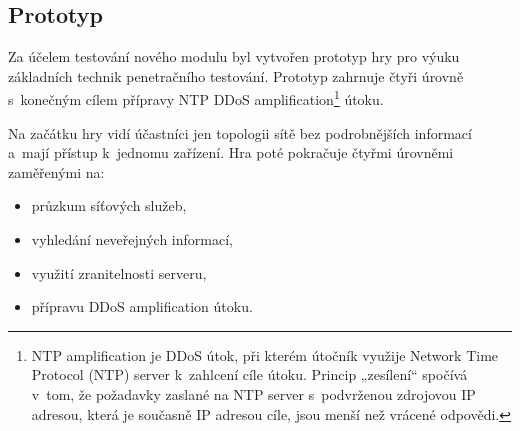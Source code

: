 \documentclass[
  digital, %
  oneside, %
  table,   %
  nolof,     %
  nolot,     %
]{fithesis3}
\begin{document}
\subsection{Prototyp}
Za účelem testování nového modulu byl vytvořen prototyp hry pro výuku základních technik penetračního testování. Prototyp zahrnuje čtyři úrovně s~konečným cílem přípravy NTP DDoS amplification\footnote{NTP amplification je DDoS útok, při kterém útočník využije Network Time Protocol (NTP) server k~zahlcení cíle útoku. Princip „zesílení“ spočívá v~tom, že požadavky zaslané na NTP server s~podvrženou zdrojovou IP adresou, která je současně IP adresou cíle, jsou menší než vrácené odpovědi.} útoku.\par
Na začátku hry vidí účastníci jen topologii sítě bez podrobnějších informací a~mají přístup k~jednomu zařízení. Hra poté pokračuje čtyřmi úrovněmi zaměřenými na:
\begin{itemize}
  \item průzkum síťových služeb,
  \item vyhledání neveřejných informací,
  \item využití zranitelnosti serveru,
  \item přípravu DDoS amplification útoku.
\end{itemize}
\end{document}
